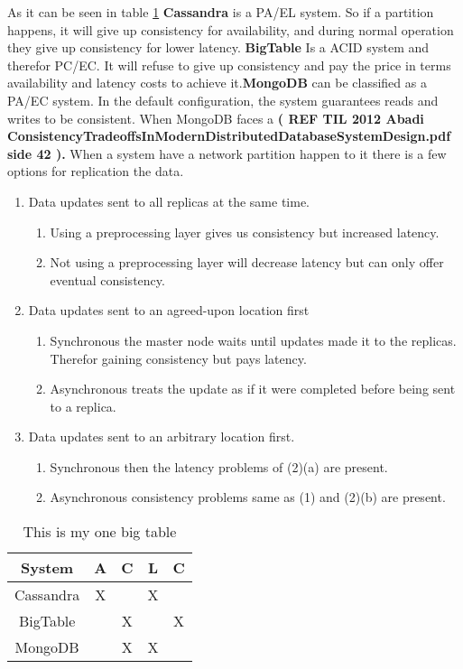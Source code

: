 As it can be seen in table \ref{tab:PACELC} \textbf{Cassandra} is a PA/EL system. So if a partition happens, it will give up consistency for availability, and during normal operation they give up consistency for lower latency. \textbf{BigTable}
Is a ACID system and therefor PC/EC. It will refuse to give up consistency and pay the price in terms availability and latency costs to achieve it.\textbf{MongoDB} can be classified as a PA/EC system. In the default configuration, the system guarantees reads and writes to be consistent. When MongoDB faces a  \textbf{( REF TIL 2012 Abadi ConsistencyTradeoffsInModernDistributedDatabaseSystemDesign.pdf side 42 ).}
When a system have a network partition happen to it there is a few options for replication the data.
\begin{enumerate}
	\item Data updates sent to all replicas at the same time.
	\begin{enumerate}
		\item Using a preprocessing layer gives us consistency but increased latency.
		\item Not using a preprocessing layer will decrease latency but can only offer eventual consistency.
	\end{enumerate}
	\item Data updates sent to an agreed-upon location first
	\begin{enumerate}
		\item Synchronous the master node waits until updates made it to the replicas. Therefor gaining consistency but pays latency.
		\item Asynchronous treats the update as if it were completed before being sent to a replica.
	\end{enumerate}
	\item Data updates sent to an arbitrary location first.
		\begin{enumerate}
		\item Synchronous then the latency problems of (2)(a) are present.
		\item Asynchronous consistency problems same as (1) and (2)(b) are present.
	\end{enumerate}
\end{enumerate}

\begin{table}
	\centering
\begin{tabular}{|c|c|c|c|c|}
	\hline 
	System & A & C & L & C \\ 
	\hline 
	Cassandra & X &  & X &  \\ 
	\hline 
	BigTable &  & X &  & X \\ 
	\hline 
	MongoDB &  & X & X &  \\ 
	\hline 
\end{tabular}
  \caption{This is my one big table} \label{tab:PACELC}
\end{table}
